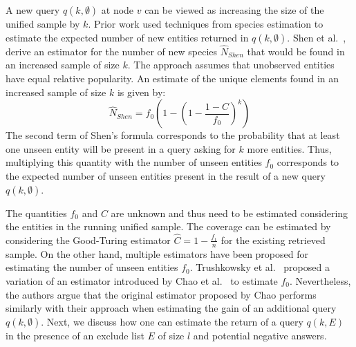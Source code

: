A new query $q(k,\emptyset)$ at node $v$ can be viewed as increasing the size of the unified sample by $k$. Prior work used techniques from species estimation to estimate the expected number of new entities returned in $q(k,\emptyset)$. Shen et al.~\cite{shen:2003}, derive an estimator for the number of new species $\hat{N}_{Shen}$ that would be found in an increased sample of size $k$. The approach assumes that unobserved entities have equal relative popularity. An estimate of the unique elements found in an increased sample of size $k$ is given by:
\begin{equation}
\label{eq:shen}
\hat{N}_{Shen} = f_0\left( 1 - \left(1 - \frac{1 - C}{f_0}\right)^k\right)
\end{equation}
The second term of Shen's formula corresponds to the probability that at least one unseen entity will be present in a query asking for $k$ more entities. Thus, multiplying this quantity with the number of unseen entities $f_0$ corresponds to the expected number of unseen entities present in the result of a new query $q(k,\emptyset)$.

The quantities $f_0$ and $C$ are unknown and thus need to be estimated considering the entities in the running unified sample. The coverage can be estimated by considering the Good-Turing estimator $\hat{C} = 1 - \frac{f_1}{n}$ for the existing retrieved sample. On the other hand, multiple estimators have been proposed for estimating the number of unseen entities $f_0$. Trushkowsky et al.~\cite{trushkowsky:2013} proposed a variation of an estimator introduced by Chao et al.~\cite{chao:1992} to estimate $f_0$. Nevertheless, the authors argue that the original estimator proposed by Chao performs similarly with their approach when estimating the gain of an additional query $q(k,\emptyset)$. Next, we discuss how one can estimate the return of a query $q(k,E)$ in the presence of an exclude list $E$ of size $l$ and potential negative answers.


